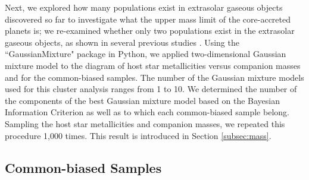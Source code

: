\documentclass[twocolumn, dvipdfmx]{aastex62}
\begin{document}
\begin{CJK*}{UTF8}{min}
Next, we explored how many populations exist in extrasolar gaseous objects discovered so far to investigate what the upper mass limit of the core-accreted planets is; we re-examined whether only two populations exist in the extrasolar gaseous objects, as shown in several previous studies \citep{2007A&A...464..779R, 2017A&A...603A..30S, 2018ApJ...853...37S}. Using the ``GaussianMixture" package in Python, we applied two-dimensional Gaussian mixture model to the diagram of host star metallicities versus companion masses and for the common-biased samples. The number of the Gaussian mixture models used for this cluster analysis ranges from 1 to 10. We determined the number of the components of the best Gaussian mixture model based on the Bayesian Information Criterion as well as to which each common-biased sample belong. Sampling the host star metallicities and companion masses, we repeated this procedure 1,000 times. This result is introduced in Section \ref{subsec:mass}.


\subsection{Common-biased Samples} \label{subsec:common}


\end{CJK*}
\end{document}
